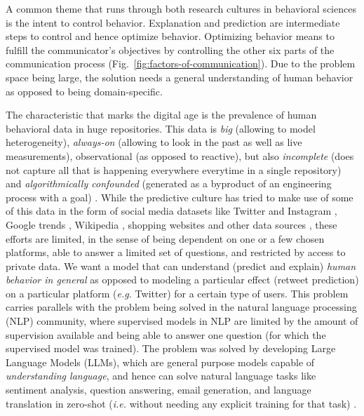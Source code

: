 \documentclass[hidelinks,11pt,a4paper]{report}
\renewcommand{\cite}[1]{\citep{#1}}
\begin{document}
A common theme that runs through both research cultures in behavioral sciences is the intent to control behavior. Explanation and prediction are intermediate steps to control and hence optimize behavior. Optimizing behavior means to fulfill the communicator's objectives by controlling the other six parts of the communication process (Fig.~\ref{fig:factors-of-communication}). Due to the problem space being large, the solution needs a general understanding of human behavior as opposed to being domain-specific. 


The characteristic that marks the digital age is the prevalence of human behavioral data in huge repositories. This data is \textit{big} (allowing to model heterogeneity), \textit{always-on} (allowing to look in the past as well as live measurements), observational (as opposed to reactive), but also \textit{incomplete} (does not capture all that is happening everywhere everytime in a single repository) and \textit{algorithmically confounded} (generated as a byproduct of an engineering process with a goal) \cite{salganik2019bit}. While the predictive culture has tried to make use of some of this data in the form of social media datasets like Twitter \cite{tumasjan2010predicting,asur2010predicting} and Instagram \cite{kim2020multimodal}, Google trends \cite{choi2012predicting,carriere2013nowcasting}, Wikipedia \cite{generous2014global,de2021general,mestyan2013early}, shopping websites \cite{krumme2013predictability,de2015unique} and other data sources \cite{brockmann2006scaling,song2010limits,miritello2013limited}, these efforts are limited, in the sense of being dependent on one or a few chosen platforms, able to answer a limited set of questions, and restricted by access to private data. We want a model that can understand (predict and explain) \textit{human behavior in general} as opposed to modeling a particular effect (retweet prediction) on a particular platform (\textit{e.g.} Twitter) for a certain type of users.
This problem carries parallels with the problem being solved in the natural language processing (NLP) community, where supervised models in NLP are limited by the amount of supervision available and being able to answer one question (for which the supervised model was trained). The problem was solved by developing Large Language Models (LLMs), which are general purpose models capable of \textit{understanding language}, and hence can solve natural language tasks like sentiment analysis, question answering, email generation, and language translation in zero-shot (\textit{i.e.} without needing any explicit training for that task) \cite{devlin2018bert,brown2020language,radford2018improving,raffel2020exploring,radford2019language}.
\end{document}
